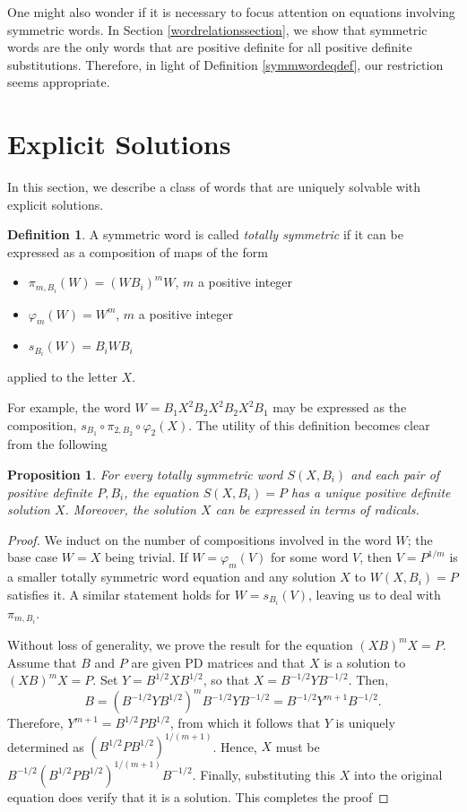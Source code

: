 \documentclass{amsart}
\newtheorem{prop}[thm]{Proposition}
\theoremstyle{definition}
\newtheorem{defn}[thm]{Definition}
\theoremstyle{remark}
\numberwithin{equation}{section}
\newcommand{\<}{\langle}
\renewcommand{\>}{\rangle}
\begin{document}
One might also wonder if it is necessary to focus attention on equations involving symmetric words.  In Section \ref{wordrelationssection}, we show that symmetric words are the only words that are positive definite for all positive definite substitutions.  Therefore, in light of Definition \ref{symmwordeqdef}, our restriction seems appropriate.

\section{Explicit Solutions}

In this section, we describe a class of words that are uniquely solvable with explicit solutions.

\begin{defn}
A symmetric word is called \textit{totally symmetric} if it can be expressed as a composition of maps of the form
\begin{itemize}
\item  $\pi_{m,B_i}(W) = (WB_i)^mW$, $m$ a positive integer
\item $\varphi_m (W) = W^m$, $m$ a positive integer
\item $s_{B_i}(W) = B_iWB_i$
\end{itemize}
applied to the letter $X$.
\end{defn}

For example, the word $W = B_1X^2B_2X^2B_2X^2B_1$ may be expressed as the composition, $s_{B_1} \circ \pi_{2,B_2} \circ \varphi_2 (X)$.  The utility of this definition becomes clear from the following

\begin{prop}
For every totally symmetric word $S(X,B_i)$ and each pair of positive definite $P,B_i$, the equation $S(X,B_i) = P$ has a unique positive definite solution $X$.  Moreover, the solution $X$ can be expressed in terms of radicals.
\end{prop}

\begin{proof}
We induct on the number of compositions involved in the word $W$; the base case $W = X$ being trivial.  If $W = \varphi_m(V)$ for some word $V$, then $V = P^{1/m}$ is a smaller totally symmetric word equation and any solution $X$ to $W(X,B_i) = P$ satisfies it.  A similar statement holds for $W = s_{B_i}(V)$, leaving us to deal with $\pi_{m,B_i}$. 

Without loss of generality, we prove the result for the equation $(XB)^mX = P$.  Assume that $B$ and $P$ are given PD matrices and that $X$ is a solution to $(XB)^mX = P$.  Set $Y = B^{1/2}XB^{1/2}$, so that $X = B^{-1/2}YB^{-1/2}$. Then, \[B = (B^{-1/2}YB^{1/2})^mB^{-1/2}YB^{-1/2} = B^{-1/2}Y^{m+1}B^{-1/2}.\] Therefore, $Y^{m+1} = B^{1/2}PB^{1/2}$, from which it follows that $Y$ is uniquely determined as $(B^{1/2}PB^{1/2})^{1/(m+1)}$. Hence, $X$ must be $B^{-1/2}(B^{1/2}PB^{1/2})^{1/(m+1)}B^{-1/2}$. Finally, substituting this $X$ into the original equation does verify that it is a solution.  This completes the proof
\end{proof}
\end{document}
